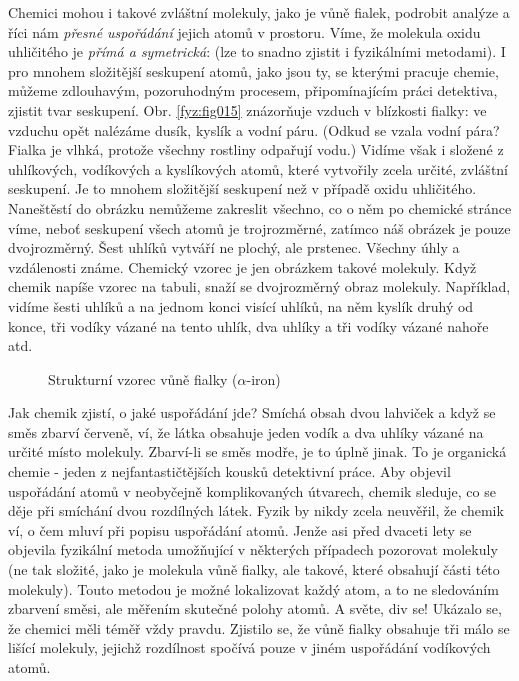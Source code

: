      Chemici mohou i takové zvláštní molekuly, jako je vůně fialek, podrobit analýze a říci nám 
      \emph{přesné uspořádání} jejich atomů v prostoru. Víme, že molekula oxidu uhličitého je 
      \emph{přímá a symetrická}:  (lze to snadno zjistit i fyzikálními 
      metodami). I pro mnohem složitější seskupení atomů, jako jsou ty, se kterými pracuje chemie, 
      můžeme zdlouhavým, pozoruhodným procesem, připomínajícím práci detektiva, zjistit tvar 
      seskupení. Obr. \ref{fyz:fig015} znázorňuje vzduch v blízkosti fialky: ve vzduchu opět 
      nalézáme dusík, kyslík a vodní páru. (Odkud se vzala vodní pára? Fialka je vlhká, protože 
      všechny rostliny odpařují vodu.) Vidíme však i  složené z uhlíkových, vodíkových 
      a kyslíkových atomů, které vytvořily zcela určité, zvláštní seskupení. Je to mnohem 
      složitější seskupení než v případě oxidu uhličitého. Naneštěstí do obrázku nemůžeme zakreslit 
      všechno, co o něm po chemické stránce víme, neboť seskupení všech atomů je trojrozměrné, 
      zatímco náš obrázek je pouze dvojrozměrný. Šest uhlíků vytváří ne plochý, ale  
      prstenec. Všechny úhly a vzdálenosti známe. Chemický vzorec je jen obrázkem takové molekuly. 
      Když chemik napíše vzorec na tabuli, snaží se  dvojrozměrný obraz molekuly. 
      Například, vidíme  šesti uhlíků a na jednom konci visící  uhlíků, na 
      něm kyslík druhý od konce, tři vodíky vázané na tento uhlík, dva uhlíky a tři vodíky vázané 
      nahoře atd.

      \begin{figure}[hbt!]    %
        \centering
        \caption{Strukturní vzorec vůně fialky (\(\alpha\)-iron) \cite[s.~24]{Feynman01}}
        \label{fyz:fig016}
      \end{figure}

      Jak chemik zjistí, o jaké uspořádání jde? Smíchá obsah dvou lahviček a když se směs zbarví 
      červeně, ví, že látka obsahuje jeden vodík a dva uhlíky vázané na určité místo molekuly. 
      Zbarví-li se směs modře, je to úplně jinak. To je organická chemie - jeden z 
      nejfantastičtějších kousků detektivní práce. Aby objevil uspořádání atomů v neobyčejně 
      komplikovaných útvarech, chemik sleduje, co se děje při smíchání dvou rozdílných látek. Fyzik 
      by nikdy zcela neuvěřil, že chemik ví, o čem mluví při popisu uspořádání atomů. Jenže asi 
      před dvaceti lety se objevila fyzikální metoda umožňující v některých případech pozorovat 
      molekuly (ne tak složité, jako je molekula vůně fialky, ale takové, které obsahují části této 
      molekuly). Touto metodou je možné lokalizovat každý atom, a to ne sledováním zbarvení směsi, 
      ale měřením skutečné polohy atomů. A světe, div se! Ukázalo se, že chemici měli téměř vždy 
      pravdu. Zjistilo se, že vůně fialky obsahuje tři málo se lišící molekuly, jejichž rozdílnost 
      spočívá pouze v jiném uspořádání vodíkových atomů. 
      
